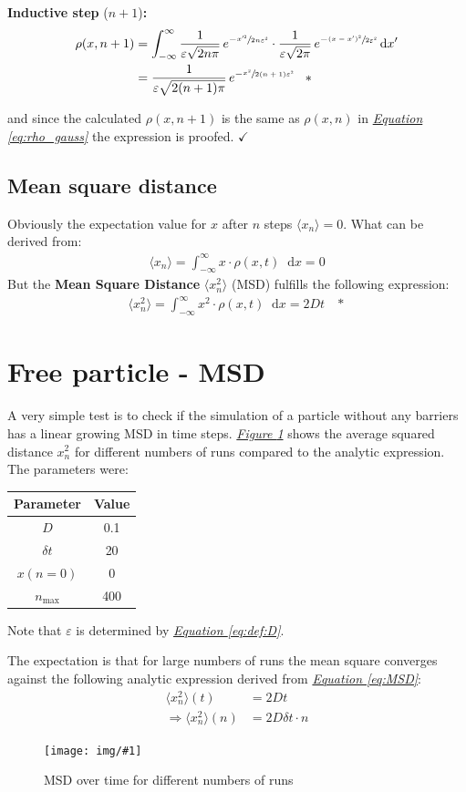 \documentclass[a4paper, parskip=half]{scrartcl}
\newcommand{\effect}[1]{%
	\textbf{#1}%
}
\newcommand{\myImage}[2]{
	\begin{figure}[H]
	\centering
	\texttt{[image: img/\#1]}
	\caption{#2}
	\label{pic:#1}
	\end{figure}
}
\newcommand{\diff}{\mathop{}\!\mathrm{d}}
\newcommand{\myFigRef}[1]{\textit{\hyperref[#1]{Figure \ref*{#1}}}}
\newcommand{\myEqRef}[1]{\textit{\hyperref[eq:#1]{Equation \ref*{eq:#1}}}}
\newcommand{\myEqLabel}[1]{\label{eq:#1}}
\newcommand{\myEqAnnex}[1]{\;\;\;\ast \myEqLabel{#1}}
\begin{document}
\textbf{Inductive step} ($n + 1$)\textbf{:}
\begin{align}
\rho(x,n+1) &= \int_{-\infty}^\infty \frac{1}{\varepsilon\sqrt{2n\pi}}\, e^{-\sfrac{x'^2}{2n\varepsilon^2}} \cdot \frac{1}{\varepsilon\sqrt{2\pi}}\, e^{-\sfrac{(x - x')^2}{2\varepsilon^2}} \diff x'\\
&= \frac{1}{\varepsilon\sqrt{2(n+1)\pi}}\, e^{-\sfrac{x^2}{2(n+1)\varepsilon^2}} \myEqAnnex{gauss_random_walk}
\end{align}

and since the calculated $\rho(x,n+1)$ is the same as $\rho(x,n)$ in \myEqRef{rho_gauss} the expression is proofed. $\checkmark$
\subsection{Mean square distance}
Obviously the expectation value for $x$ after $n$ steps $\langle x_n\rangle = 0$. What can be derived from:
\begin{align}
\langle x_n\rangle = \int_{-\infty}^\infty x \cdot \rho(x,t)\diff x = 0
\end{align}
But the \effect{Mean Square Distance} $\langle x_n^2\rangle$ (MSD) fulfills the following expression:
\begin{align}
\langle x_n^2\rangle = \int_{-\infty}^\infty x^2 \cdot \rho(x,t)\diff x = 2 D t \myEqAnnex{MSD}
\end{align}

\newpage
\section{Free particle - MSD}
A very simple test is to check if the simulation of a particle without any barriers has a linear growing MSD in time steps. \myFigRef{pic:mean_square} shows the average squared distance $x_n^2$ for different numbers of runs compared to the analytic expression. The parameters were:
\begin{center}
\begin{tabular}{c|c}
Parameter & Value \\\hline
$D$ & 0.1 \\
$\delta t$ & 20 \\
$x(n=0)$ & 0 \\
$n_{\mathrm{max}}$ & 400
\end{tabular}
\end{center}
Note that $\varepsilon$ is determined by \myEqRef{def:D}.

The expectation is that for large numbers of runs the mean square converges against the following analytic expression derived from \myEqRef{MSD}:
\begin{align}
\langle x_n^2\rangle (t) &= 2 D t \\
\Rightarrow\langle x_n^2\rangle (n) &= 2 D \delta t \cdot n
\end{align}
\myImage{mean_square}{MSD over time for different numbers of runs}
\end{document}

